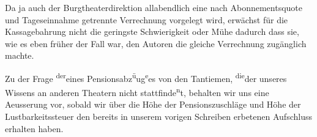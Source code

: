 \pstart
           Da ja auch der Burgtheaterdirektion allabendlich
               eine nach Abonnementsquote und Tageseinnahme getrennte Verrechnung vorgelegt wird,
               erwächst für die Kassagebahrung nicht die geringste Schwierigkeit oder Mühe dadurch
               dass sie, wie es eben früher der Fall war, den Autoren die gleiche Verrechnung zu{\pb}gänglich machte.\pend
           
\pstart
           Zu der Frage \substVorne{}\textsuperscript{der}\substDazwischen{}eines\substHinten{} Pensionsabz\substVorne{}\textsuperscript{ü}\substDazwischen{}u\substHinten{}g\substVorne{}\textsuperscript{e}\substDazwischen{}es\substHinten{} von den Tantiemen, \substVorne{}\textsuperscript{die}\substDazwischen{}der\substHinten{} unseres Wissens an anderen Theatern  nicht stattfinde\substVorne{}\textsuperscript{n}\substDazwischen{}t\substHinten{}, behalten wir uns eine Aeusserung vor, sobald wir über die Höhe der
               Pensionszuschläge und Höhe der Lustbarkeitssteuer den bereits in unserem vorigen
               Schreiben erbetenen Aufschluss erhalten haben.\pend
           \endnumbering{}  \newcommand{\dateiname}{L02409}\newcommand{\titel}{Arthur Schnitzler an Richard Beer-Hofmann, 21. 1. 1924}\newcommand{\editorInnen}{Martin Anton Müller und Gerd-Hermann Susen}
